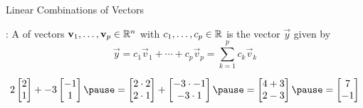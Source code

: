 \documentclass[xcoler=dvipsnames, aspectratio=169]{beamer}
\begin{document}
    \begin{frame}{Linear Combinations of Vectors}
        \begin{defn}
            : A  of vectors $\mathbf{v}_1,\dots,\mathbf{v}_p\in\mathbb{R}^n$ with 
             $c_1,\dots,c_p\in\mathbb{R}$ is the vector $\vec{y}$ given by
            \[
                \vec{y} = c_1\vec{v}_1 + \cdots + c_p\vec{v}_p = \sum_{k=1}^p c_k\vec{v}_k
            \]
        \end{defn}
        \pause
        \begin{example}
            \[
                2\begin{bmatrix}
                    2\\1
                \end{bmatrix} + -3\begin{bmatrix} 
                    -1\\1
                \end{bmatrix}\pause = \begin{bmatrix}
                    2\cdot 2\\2\cdot 1
                \end{bmatrix} + \begin{bmatrix}
                    -3\cdot -1\\ -3\cdot 1
                \end{bmatrix}\pause =
                \begin{bmatrix}
                    4+3\\2-3
                \end{bmatrix}\pause =
                \begin{bmatrix}
                    7\\-1
                \end{bmatrix}
            \]
        \end{example}
    \end{frame}
\end{document}

